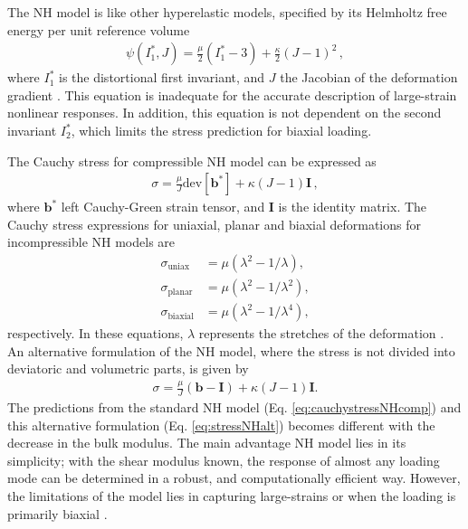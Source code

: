 The NH model is like other hyperelastic models, specified by its Helmholtz free energy per unit 
reference volume
\begin{align}
        \psi(I_1^*,J) = \frac{\mu}{2}(I_1^* - 3) + \frac{\kappa}{2}(J - 1)^2 \, ,
        \label{eq:helmholtzNH}
\end{align}
where $I_1^*$ is the distortional first invariant, and $J$ the Jacobian of the deformation gradient \cite{Youssef2022}.
This equation is inadequate for the accurate description of large-strain nonlinear responses. 
In addition, this equation is not dependent on the second invariant $I_2^*$, which limits the 
stress prediction for biaxial loading.

The Cauchy stress for compressible NH model can be expressed as \cite{Youssef2022}
\begin{align}
        \sigma = \frac{\mu}{J}\text{dev}[\boldsymbol{b}^*] + \kappa(J-1)\boldsymbol{I} \, ,
        \label{eq:cauchystressNHcomp}
\end{align}
where $\boldsymbol{b}^*$ left Cauchy-Green strain tensor, and $\boldsymbol{I}$ is the identity matrix. 
The Cauchy stress expressions for uniaxial, planar and biaxial deformations for incompressible NH models are
\begin{align}
        \sigma_{\text{uniax}} &= \mu(\lambda^2 - 1/\lambda), \label{eq:uniaxNH} \\
        \sigma_{\text{planar}} &= \mu(\lambda^2 - 1/\lambda^2), \label{eq:planarNH} \\
        \sigma_{\text{biaxial}} &= \mu(\lambda^2 - 1/\lambda^4), \label{eq:biaxialNH}
\end{align}
respectively. In these equations, $\lambda$ represents the stretches of the deformation \cite{Youssef2022}.
An alternative formulation of the NH model, where the stress is not divided into deviatoric and volumetric 
parts, is given by
\begin{align}
        \sigma = \frac{\mu}{J}(\boldsymbol{b}-\boldsymbol{I}) + \kappa(J-1)\boldsymbol{I}. \label{eq:stressNHalt}
\end{align}
The predictions from the standard NH model (Eq. \ref{eq:cauchystressNHcomp}) and this alternative formulation 
(Eq. \ref{eq:stressNHalt}) becomes different with the decrease in the bulk modulus.
The main advantage NH model lies in its simplicity; with the shear modulus known, the response of almost any loading 
mode can be determined in a robust, and computationally efficient way. However, the limitations of the model lies 
in capturing large-strains or when the loading is primarily biaxial \cite{Bergström2015}.\\

